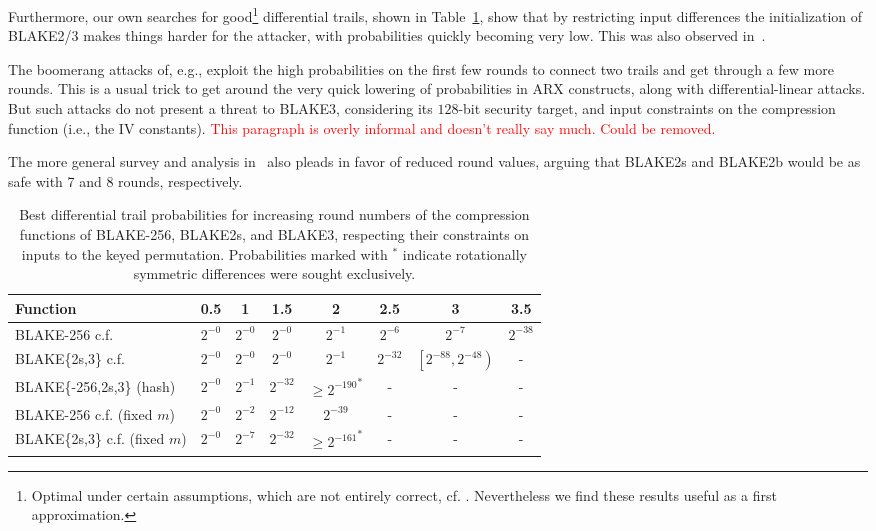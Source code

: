 \documentclass[11pt,notitlepage,a4paper]{article}
\newcommand{\alert}[1]{\textcolor{red}{#1}}
\begin{document}
Furthermore, our own searches for good\footnote{Optimal under certain assumptions, which are not entirely correct, cf. \cite{cryptoeprint:2013:328}. Nevertheless we find these results useful as a first approximation.} differential trails, shown in Table~\ref{tab:trails}, show that by restricting input differences the initialization of BLAKE2/3 makes things harder for the attacker, with probabilities quickly becoming very low. This was also observed in~\cite[\S7]{DBLP:conf/ctrsa/0001KNWW14}. 

The boomerang attacks of, e.g., \cite{DBLP:conf/cisc/Hao14,DBLP:conf/fse/BiryukovNR11,DBLP:journals/iet-ifs/BaiYWW15} exploit the high probabilities on the first few rounds to connect two trails and get through a few more rounds. This is a usual trick to get around the very quick lowering of probabilities in ARX constructs, along with differential-linear attacks. But such attacks do not present a threat to BLAKE3, considering its $128$-bit security target, and input constraints on the compression function (i.e., the IV constants). \alert{This paragraph is overly informal and doesn't really say much. Could be removed.}

The more general survey and analysis in~\cite{TMC} also pleads in favor
of reduced round values, arguing that BLAKE2s and BLAKE2b would be as
safe with 7 and 8 rounds, respectively.

\begin{table}[t]
  \centering
  \caption{Best differential trail probabilities for increasing round numbers of the compression functions of BLAKE-256, BLAKE2s, and BLAKE3, respecting their constraints on inputs to the keyed permutation. Probabilities marked with ${}^\ast$ indicate rotationally symmetric differences were sought exclusively.}%
  \label{tab:trails}
  \begin{tabular}{lccccccc}
    \toprule
    Function & 0.5   & 1     & 1.5   & 2     & 2.5   & 3     & 3.5 \\ \midrule
    BLAKE-256 c.f. & $2^{-0}$ & $2^{-0}$ & $2^{-0}$ & $2^{-1}$ & $2^{-6}$ & $2^{-7}$ & $2^{-38}$  \\
    BLAKE\{2s,3\} c.f.   &  $2^{-0}$  & $2^{-0}$ &  $2^{-0}$  & $2^{-1}$ & $2^{-32}$   & $\left[2^{-88}, 2^{-48}\right)$ & -  \\
    BLAKE\{-256,2s,3\} (hash) & $2^{-0}$ & $2^{-1}$ & $2^{-32}$ & ${\ge 2^{-190}}^\ast$ & - & - & -  \\ %
    BLAKE-256 c.f. (fixed $m$) & $2^{-0}$ & $2^{-2}$ & $2^{-12}$ & $2^{-39}$ & - & - & - \\
    BLAKE\{2s,3\} c.f. (fixed $m$) & $2^{-0}$ & $2^{-7}$ & $2^{-32}$ & ${\ge 2^{-161}}^\ast$ & - & - & - \\ %
    \bottomrule
  \end{tabular}
\end{table}
\end{document}
